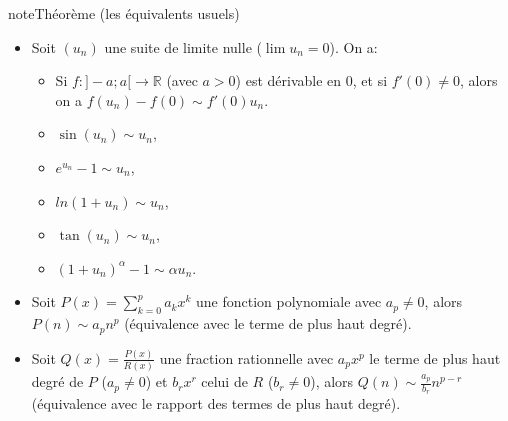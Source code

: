 \documentclass[letterpaper,10pt,french]{jupyterBook}
\begin{document}
\begin{sphinxadmonition}{note}{Théorème (les équivalents usuels)}
\begin{itemize}
\item {} 
\sphinxAtStartPar
Soit \((u_n)\) une suite de limite nulle (\(\lim u_n =0\)). On a:
\begin{itemize}
\item {} 
\sphinxAtStartPar
Si \(f : ]− a;a[\to \mathbb{R}\) (avec \(a > 0\)) est dérivable en \(0\), et si \(f'(0) \neq 0\), alors on a \(f(u_n)− f(0) \sim f'(0)u_n\).

\item {} 
\sphinxAtStartPar
\(\sin(u_n) \sim u_n\),

\item {} 
\sphinxAtStartPar
\(e^{u_n} - 1 \sim u_n\),

\item {} 
\sphinxAtStartPar
\(ln(1+u_n)\sim u_n\),

\item {} 
\sphinxAtStartPar
\(\tan(u_n) \sim u_n\),

\item {} 
\sphinxAtStartPar
\((1+u_n)^\alpha -1 \sim \alpha u_n\).

\end{itemize}

\item {} 
\sphinxAtStartPar
Soit \(P(x) = \sum_{k=0}^{p} a_kx^k\) une fonction polynomiale avec \(a_p \neq 0\), alors \(P(n) \sim a_pn^p\) (équivalence avec le
terme de plus haut degré).

\item {} 
\sphinxAtStartPar
Soit \(Q(x) =\frac{P(x)}{R(x)}\) une fraction rationnelle avec \(a_px^p\) le terme de plus haut degré de \(P\) (\(a_p \neq 0\)) et \(b_rx^r\) celui de \(R\) (\(b_r \neq 0\)), alors \(Q(n) \sim \frac{a_p}{b_r}n^{p−r}\) (équivalence avec le rapport des termes de plus haut degré).

\end{itemize}
\end{sphinxadmonition}
\end{document}
